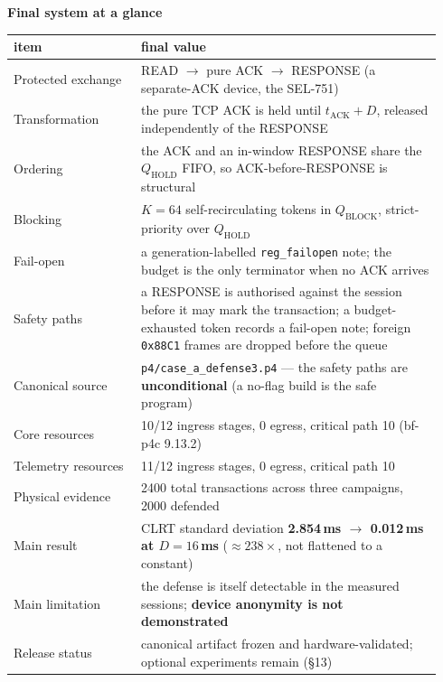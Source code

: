 \documentclass[10pt,a4paper,oneside]{article}
\newcommand{\num}[1]{\mbox{#1}}
\newcommand{\code}[1]{\texttt{\small #1}}
\begin{document}
\vspace{0.6em}
\noindent\textbf{\large Final system at a glance}

\nopagebreak
{\footnotesize
\begin{longtable}{p{0.28\linewidth} p{0.66\linewidth}}
\toprule
\textbf{item} & \textbf{final value} \\
\midrule
\endhead
Protected exchange & READ $\to$ pure ACK $\to$ RESPONSE (a separate-ACK device, the SEL-751) \\
Transformation & the pure TCP ACK is held until $t_{\mathrm{ACK}}+D$, released independently of the RESPONSE \\
Ordering & the ACK and an in-window RESPONSE share the $Q_{\mathrm{HOLD}}$ FIFO, so ACK-before-RESPONSE is structural \\
Blocking & $K=64$ self-recirculating tokens in $Q_{\mathrm{BLOCK}}$, strict-priority over $Q_{\mathrm{HOLD}}$ \\
Fail-open & a generation-labelled \code{reg\_failopen} note; the budget is the only terminator when no ACK arrives \\
Safety paths & a RESPONSE is authorised against the session before it may mark the transaction; a budget-exhausted token records a fail-open note; foreign \code{0x88C1} frames are dropped before the queue \\
Canonical source & \code{p4/case\_a\_defense3.p4} --- the safety paths are \textbf{unconditional} (a no-flag build is the safe program) \\
Core resources & 10/12 ingress stages, 0 egress, critical path 10 (bf-p4c 9.13.2) \\
Telemetry resources & 11/12 ingress stages, 0 egress, critical path 10 \\
Physical evidence & \num{2400} total transactions across three campaigns, \num{2000} defended \\
Main result & CLRT standard deviation \textbf{\num{2.854}\,ms $\to$ \num{0.012}\,ms at $D=16$\,ms} (${\approx}238\times$, not flattened to a constant) \\
Main limitation & the defense is itself detectable in the measured sessions; \textbf{device anonymity is not demonstrated} \\
Release status & canonical artifact frozen and hardware-validated; optional experiments remain (\S13) \\
\bottomrule
\end{longtable}}
\end{document}

